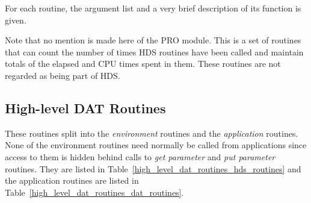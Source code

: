 For each routine, the argument list and a very brief description of its
function is given.

Note that no mention is made here of the PRO module. This is a set of routines
that can count the number of times HDS routines have been called and maintain
totals of the elapsed and CPU times spent in them. These routines are not
regarded as being part of HDS.

\subsection {High-level DAT Routines}

These routines split into the {\em environment} routines and the {\em
application} routines. None of the environment routines need normally be called
from applications since access to them is hidden behind calls to {\em get
parameter} and {\em put parameter} routines. They are listed in
Table~\ref{high_level_dat_routines_hds_routines} and the application routines
are listed in Table~\ref{high_level_dat_routines_dat_routines}.

